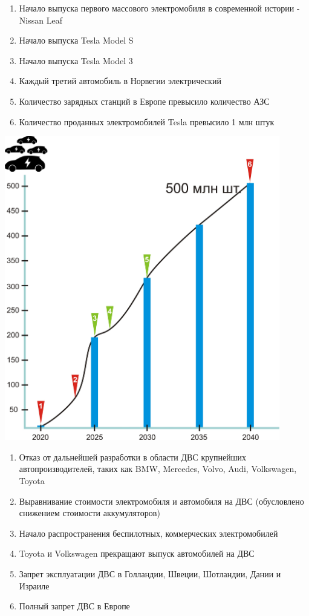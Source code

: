 \documentclass[a4paper,12pt]{report}
\begin{document}
\begin{enumerate}
	\item Начало выпуска первого массового электромобиля в современной истории - Nissan Leaf
	\item Начало выпуска Tesla Model S
	\item Начало выпуска Tesla Model 3
	\item Каждый третий автомобиль в Норвегии электрический
	\item Количество зарядных станций в Европе превысило количество АЗС
	\item Количество проданных электромобилей Tesla превысило 1 млн штук
\end{enumerate}



\vspace*{1cm}
\includegraphics[width=12cm]{chart2}
\vspace*{1cm}

\begin{enumerate}
	\item Отказ от дальнейшей разработки в области ДВС крупнейших автопроизводителей, таких как BMW, Mercedes, Volvo, Audi, Volkswagen, Toyota
	\item Выравнивание стоимости электромобиля и автомобиля на ДВС (обусловлено снижением стоимости аккумуляторов)
	\item Начало распространения беспилотных, коммерческих электромобилей
	\item Toyota и Volkswagen прекращают выпуск автомобилей на ДВС
	\item Запрет эксплуатации ДВС в Голландии, Швеции, Шотландии, Дании и Израиле
	\item Полный запрет ДВС в Европе
\end{enumerate}
\end{document}
